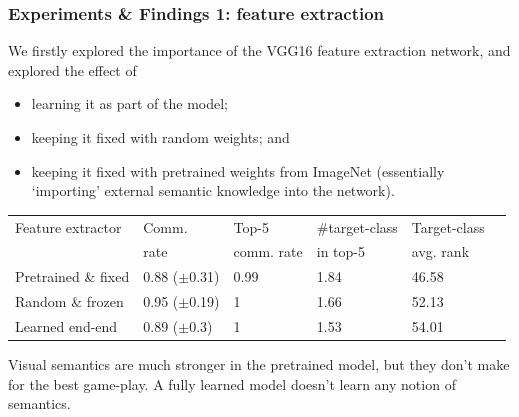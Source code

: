 \documentclass[\beamerclass,aspectratio=1610]{beamer}
\begin{document}
\begin{frame}
\frametitle{Experiments \& Findings 1: feature extraction}
We firstly explored the importance of the VGG16 feature extraction network, and explored the effect of \begin{itemize}
		\item learning it as part of the model;
		\item keeping it fixed with random weights; and
		\item keeping it fixed with pretrained weights from ImageNet (essentially `importing' external semantic knowledge into the network).  \\[1em]
\end{itemize}
\pause
\centering
\begin{tabular}{llllll}
\hline
 Feature extractor & Comm. & Top-5 & \#target-class  & Target-class \\
   & rate & comm. rate & in top-5 & avg. rank \\ \hline
 Pretrained \& fixed & 0.88 ($\pm$0.31) &0.99 &1.84 &46.58\\

 Random \& frozen &0.95 ($\pm$0.19) &1 &1.66 &52.13\\

Learned end-end &0.89 ($\pm$0.3) &1 &1.53 &54.01\\ \hline
\end{tabular}

\begin{block}{}
Visual semantics are much stronger in the pretrained model, but they don't make for the best game-play. A fully learned model doesn't learn any notion of semantics.
\end{block}

\end{frame}
\end{document}
